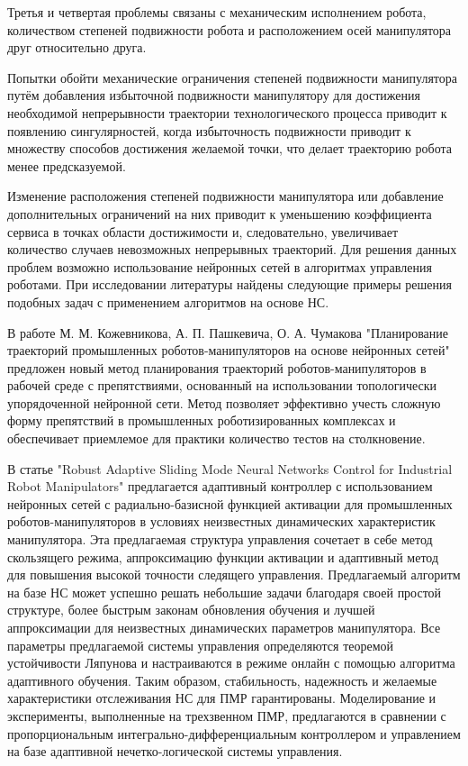 Третья и четвертая проблемы связаны с механическим исполнением робота, количеством степеней подвижности робота и расположением осей манипулятора друг относительно друга.

Попытки обойти механические ограничения степеней подвижности манипулятора путём добавления избыточной подвижности манипулятору для достижения необходимой непрерывности траектории технологического процесса приводит к появлению сингулярностей, когда избыточность подвижности приводит к множеству способов достижения желаемой точки, что делает траекторию робота менее предсказуемой.

Изменение расположения степеней подвижности манипулятора или добавление дополнительных ограничений на них приводит к уменьшению коэффициента сервиса в точках области достижимости и, следовательно, увеличивает количество случаев невозможных непрерывных траекторий.
\newpage
Для решения данных проблем возможно использование нейронных сетей в алгоритмах управления роботами. При исследовании литературы найдены следующие примеры решения подобных задач с применением алгоритмов на основе НС.

В работе М. М. Кожевникова, А. П. Пашкевича, О. А. Чумакова "Планирование траекторий промышленных роботов-манипуляторов на основе нейронных сетей" \cite{Belarus_Art} предложен новый метод планирования траекторий роботов-манипуляторов в рабочей среде с препятствиями, основанный на использовании топологически упорядоченной нейронной
сети. Метод позволяет эффективно учесть сложную форму препятствий в промышленных роботизированных комплексах и обеспечивает приемлемое для практики количество тестов на столкновение.

В статье "Robust Adaptive Sliding Mode Neural Networks Control for Industrial Robot Manipulators" \cite{Yen_Wang_Cuong_2019} предлагается адаптивный контроллер с использованием нейронных сетей с радиально-базисной функцией активации для промышленных роботов-манипуляторов в условиях неизвестных динамических характеристик манипулятора. Эта предлагаемая структура управления сочетает в себе метод скользящего режима, аппроксимацию функции активации и адаптивный метод для повышения высокой точности следящего управления. Предлагаемый алгоритм на базе НС может успешно решать небольшие задачи благодаря своей простой структуре, более быстрым законам обновления обучения и лучшей аппроксимации для неизвестных динамических параметров манипулятора. Все параметры предлагаемой системы управления определяются теоремой устойчивости Ляпунова и настраиваются в режиме онлайн с помощью алгоритма адаптивного обучения. Таким образом, стабильность, надежность и желаемые характеристики отслеживания НС для ПМР гарантированы. Моделирование и эксперименты, выполненные на трехзвенном ПМР, предлагаются в сравнении с пропорциональным интегрально-дифференциальным контроллером и управлением на базе адаптивной нечетко-логической системы управления.

